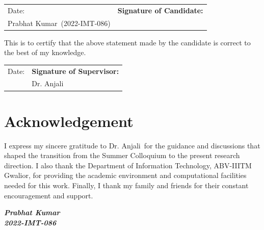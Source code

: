 \documentclass[12pt,a4paper,twoside,openright]{report}
\newcommand{\studentname}{Prabhat Kumar}
\newcommand{\rollnumber}{2022-IMT-086}
\newcommand{\supervisorname}{Dr. Anjali}
\begin{document}
\vspace{1.5cm}
\begin{center}
\begin{tabular}{p{}p{}}
Date: & \textbf{Signature of Candidate:} \\[0.4cm]
\studentname\ (\rollnumber) & \\
\end{tabular}
\end{center}

\vspace{1.5cm}
\noindent This is to certify that the above statement made by the candidate is correct to the best of my knowledge.

\vspace{1.2cm}
\begin{center}
\begin{tabular}{p{}p{}}
Date: & \textbf{Signature of Supervisor:} \\[0.4cm]
& \supervisorname \\
\end{tabular}
\end{center}

\cleardoublepage
\chapter*{Acknowledgement}
\vspace{0.5cm}
\noindent
I express my sincere gratitude to \supervisorname\ for the guidance and discussions that shaped the transition from the Summer Colloquium to the present research direction. I also thank the Department of Information Technology, ABV-IIITM Gwalior, for providing the academic environment and computational facilities needed for this work. Finally, I thank my family and friends for their constant encouragement and support.

\vspace{1cm}
\begin{flushright}
\textit{\textbf{\studentname}}\\
\textit{\textbf{\rollnumber}}
\end{flushright}

\cleardoublepage
\end{document}
